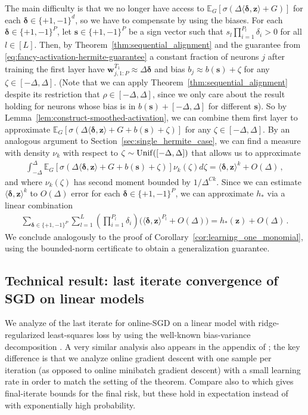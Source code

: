 \documentclass[11pt]{article}
\newcommand{\E}{\mathbb{E}}
\newcommand{\<}{\langle}
\renewcommand{\>}{\rangle}
\theoremstyle{definition}
\def\bs{{\boldsymbol s}}
\def\bw{{\boldsymbol w}}
\def\bz{{\boldsymbol z}}
\def\bdelta{{\boldsymbol\delta}}
\def\Unif{{\rm Unif}}
\def\Unif{{\sf Unif}}
\def\Unif{{\sf Unif}}
\def\bz{{\boldsymbol z}}
\def\bdelta{{\boldsymbol\delta}}
\def\bw{{\boldsymbol w}}
\def\Unif{{\rm Unif}}
\def\bz{{\boldsymbol z}}
\def\oT{\overline{T}}
\begin{document}
The main difficulty is that we no longer have access to $\E_G[\sigma(\Delta\<\bdelta,\bz\> + G)]$ for each $\bdelta \in \{+1,-1\}^d$, so we have to compensate by using the biases. For each $\bdelta \in \{+1,-1\}^P$, let $\bs \in \{+1,-1\}^P$ be a sign vector such that $s_l \prod_{i=1}^{P_l} \delta_{i} > 0$ for all $l \in [L]$. Then, by Theorem~\ref{thm:sequential_alignment} and the guarantee from \eqref{eq:fancy-activation-hermite-guarantee} a constant fraction of neurons $j$ after training the first layer have $\bw^{\oT_1}_{j,1:P} \approx \Delta \bdelta$ and bias $b_j \approx b(\bs) + \zeta$ for any $\zeta \in [-\Delta,\Delta]$. (Note that we can apply Theorem~\ref{thm:sequential_alignment} despite its restriction that $\rho \in [-\Delta,\Delta]$, since we only care about the result holding for neurons whose bias is in $b(\bs) + [-\Delta,\Delta]$ for different $\bs$). So by Lemma~\ref{lem:construct-smoothed-activation}, we can combine them first layer to approximate $\E_{G}[\sigma(\Delta\<\bdelta,\bz\> + G + b(\bs) + \zeta)]$ for any $\zeta\in [-\Delta,\Delta]$. By an analogous argument to Section~\ref{sec:single_hermite_case}, we can find a measure with density $\nu_k$ with respect to $\zeta \sim \Unif([-\Delta,\Delta])$ that allows us to approximate
\begin{align*}
\int_{-\Delta}^{\Delta}\E_{G}[\sigma(\Delta\<\bdelta,\bz\> + G + b(\bs) + \zeta)] \nu_k(\zeta) d\zeta = \<\bdelta,\bz\>^k + O(\Delta)\,,
\end{align*}
and where $\nu_k(\zeta)$ has second moment bounded by $1/\Delta^{Ck}$. Since we can estimate $\<\bdelta,\bz\>^k$ to $O(\Delta)$ error for each $\bdelta \in \{+1,-1\}^P$, we can approximate $h_*$ via a linear combination
\begin{align*}
\sum_{\bdelta \in \{+1,-1\}^P} \sum_{l=1}^{L} \left(\prod_{i=1}^{P_l} \delta_i \right) \big(\<\bdelta,\bz\>^{P_l} + O(\Delta)\big) = h_*(\bz) + O(\Delta)\,.
\end{align*}
We conclude analogously to the proof of Corollary~\ref{cor:learning_one_monomial}, using the bounded-norm certificate to obtain a generalization guarantee.



\subsection{Technical result: last iterate convergence of SGD on linear models}\label{sec:technical-fitting}


We analyze of the last iterate for online-SGD on a linear model with ridge-regularized least-squares loss by using the well-known bias-variance decomposition \cite{jain2017markov}. A very similar analysis also appears in the appendix of \cite{abbe2022merged}; the key difference is that we analyze online gradient descent with one sample per iteration (as opposed to online minibatch gradient descent) with a small learning rate in order to match the setting of the theorem. Compare also to \cite{zhang2004solving} which gives final-iterate bounds for the final risk, but these hold in expectation instead of with exponentially high probability.
\end{document}
